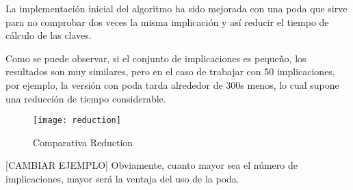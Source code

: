 La implementaci\'on inicial del algoritmo ha sido mejorada con una poda que sirve para no comprobar dos veces la misma implicaci\'on y as\'i reducir el tiempo de c\'alculo de las claves.

Como se puede observar, si el conjunto de implicaciones es peque\~no, los resultados son muy similares, pero en el caso de trabajar con 50 implicaciones, por ejemplo, la versi\'on con poda tarda alrededor de 300s menos, lo cual supone una reducci\'on de tiempo considerable.

\begin{figure}[H]
    \centering
    \texttt{[image: reduction]}
    \caption{Comparativa Reduction}
    \label{fig:reduction}
\end{figure}
[CAMBIAR EJEMPLO]
Obviamente, cuanto mayor sea el n\'umero de implicaciones, mayor ser\'a la ventaja del uso de la poda.